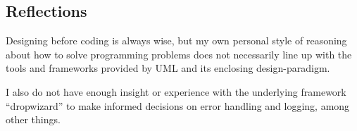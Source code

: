 \subsection{Reflections}\label{task-2-reflect}
Designing before coding is always wise, but my own personal style of reasoning
about how to solve programming problems does not necessarily line up with the
tools and frameworks provided by UML and its enclosing design-paradigm.

I also do not have enough insight or experience with the underlying framework
``dropwizard''\cite{framework:dropwizard} to make informed decisions on error
handling and logging, among other things.

